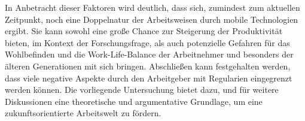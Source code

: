 \documentclass[12pt,a4paper]{article}
\begin{document}
In Anbetracht dieser Faktoren wird deutlich, dass sich, zumindest zum aktuellen Zeitpunkt, noch eine Doppelnatur der Arbeitsweisen durch mobile Technologien ergibt. Sie kann sowohl eine große Chance zur Steigerung der Produktivität bieten, im Kontext der Forschungsfrage, als auch potenzielle Gefahren für das Wohlbefinden und die Work-Life-Balance der Arbeitnehmer und besonders der älteren Generationen mit sich bringen. Abschließen kann festgehalten werden, dass viele negative Aspekte durch den Arbeitgeber mit Regularien eingegrenzt werden können. Die vorliegende Untersuchung bietet dazu, und für weitere Diskussionen eine theoretische und argumentative Grundlage, um eine zukunftsorientierte Arbeitswelt zu fördern.


\printbibliography
\end{document}
